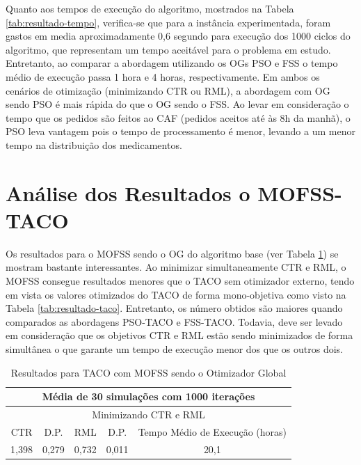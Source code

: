 Quanto aos tempos de execução do algoritmo, mostrados na Tabela \ref{tab:resultado-tempo}, verifica-se que para a instância experimentada, foram gastos em media aproximadamente 0,6 segundo para execução dos 1000 ciclos do algoritmo, que representam um tempo aceitável para o problema em estudo. Entretanto, ao comparar a abordagem utilizando os OGs PSO e FSS o tempo médio de execução passa 1 hora e 4 horas, respectivamente. Em ambos os cenários de otimização (minimizando CTR ou RML), a abordagem com OG sendo PSO é mais rápida do que o OG sendo o FSS. Ao levar em consideração o tempo que os pedidos são feitos ao CAF (pedidos aceitos até às 8h da manhã), o PSO leva vantagem pois o tempo de processamento é menor, levando a um menor tempo na distribuição dos medicamentos.

\section{Análise dos Resultados o MOFSS-TACO}
\label{sec-resultados-tempo}

Os resultados para o MOFSS sendo o OG do algoritmo base (ver Tabela \ref{tab:resultado-mofss}) se mostram bastante interessantes. Ao minimizar simultaneamente CTR e RML, o MOFSS consegue resultados menores que o TACO sem otimizador externo, tendo em vista os valores otimizados do TACO de forma mono-objetiva como visto na Tabela \ref{tab:resultado-taco}. Entretanto, os número obtidos são maiores quando comparados as abordagens PSO-TACO e FSS-TACO. Todavia, deve ser levado em consideração que os objetivos CTR e RML estão sendo minimizados de forma simultânea o que garante um tempo de execução menor dos que os outros dois.

\begin{table}[htb]
    \centering
    \caption{Resultados para TACO com MOFSS sendo o Otimizador Global} \label{tab:resultado-mofss}
    \begin{tabular}{|c|c|c|c|c|}
    \hline
    \multicolumn{5}{|c|}{Média de 30 simulações com 1000 iterações} \\ \hline
    \multicolumn{5}{|c|}{Minimizando CTR e RML}                     \\ \hline
    CTR            & D.P.          & RML            & D.P.      &Tempo Médio de Execução (horas)   \\ \hline
    1,398          & 0,279         & 0,732          & 0,011     &20,1                              \\ \hline
    \end{tabular}
    \end{table}

